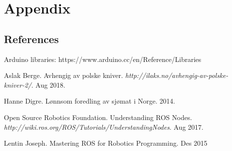 \documentclass[11pt,a4paper, titlepage]{article}
\begin{document}
	\subsection{}
	
	
	
	\section{Appendix}
	
	\subsection{References}
	Arduino libraries: https://www.arduino.cc/en/Reference/Libraries
	

\begin{thebibliography}{1}

 Aslak Berge. Avhengig av polske kniver. \textit{http://ilaks.no/avhengig-av-polske-kniver-2/}. Aug 2018.

 Hanne Digre. Lønnsom foredling av sjømat i Norge. 2014.

 Open Source Robotics Foundation. Understanding ROS Nodes.
\textit{http://wiki.ros.org/ROS/Tutorials/UnderstandingNodes}. Aug 2017.

 Lentin Joseph. Mastering ROS for Robotics Programming. Des 2015

\end{thebibliography}	
	
\end{document}
